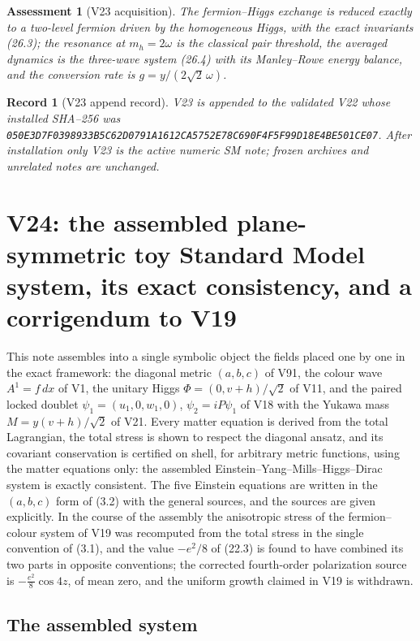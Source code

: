 \documentclass[11pt]{article}
\newtheorem{assessment}[theorem]{Assessment}
\newtheorem{record}[theorem]{Record}
\theoremstyle{remark}
\begin{document}
\begin{assessment}[V23 acquisition]
\label{ass:v20v23}
The fermion--Higgs exchange is reduced exactly to a two-level fermion
driven by the homogeneous Higgs, with the exact invariants (26.3); the
resonance at \(m_h=2\omega\) is the classical pair threshold, the
averaged dynamics is the three-wave system (26.4) with its
Manley--Rowe energy balance, and the conversion rate is
\(g=y/(2\sqrt2\,\omega)\).
\end{assessment}

\begin{record}[V23 append record]
\label{rec:v20v23}
V23 is appended to the validated V22 whose installed SHA--256 was
\texttt{050E3D7F0398933B5C62D0791A1612CA5752E78C690F4F5F99D18E4BE501CE07}.
After installation only V23 is the active numeric SM note; frozen
archives and unrelated notes are unchanged.
\end{record}


\section{V24: the assembled plane-symmetric toy Standard Model system, its exact consistency, and a corrigendum to V19}
\label{sec:v20v24}

This note assembles into a single symbolic object the fields placed
one by one in the exact framework: the diagonal metric \((a,b,c)\) of
V91, the colour wave \(A^1=f\,dx\) of V1, the unitary Higgs
\(\Phi=(0,v+h)/\sqrt2\) of V11, and the paired locked doublet
\(\psi_1=(u_1,0,w_1,0)\), \(\psi_2=iP\psi_1\) of V18 with the Yukawa
mass \(M=y(v+h)/\sqrt2\) of V21.  Every matter equation is derived
from the total Lagrangian, the total stress is shown to respect the
diagonal ansatz, and its covariant conservation is certified on
shell, for arbitrary metric functions, using the matter equations
only: the assembled Einstein--Yang--Mills--Higgs--Dirac system is
exactly consistent.  The five Einstein equations are written in the
\((a,b,c)\) form of (3.2) with the general sources, and the sources
are given explicitly.  In the course of the assembly the anisotropic
stress of the fermion--colour system of V19 was recomputed from the
total stress in the single convention of (3.1), and the value
\(-e^2/8\) of (22.3) is found to have combined its two parts in
opposite conventions; the corrected fourth-order polarization source
is \(-\tfrac{e^2}8\cos4z\), of mean zero, and the uniform growth
claimed in V19 is withdrawn.

\subsection{The assembled system}
\end{document}

